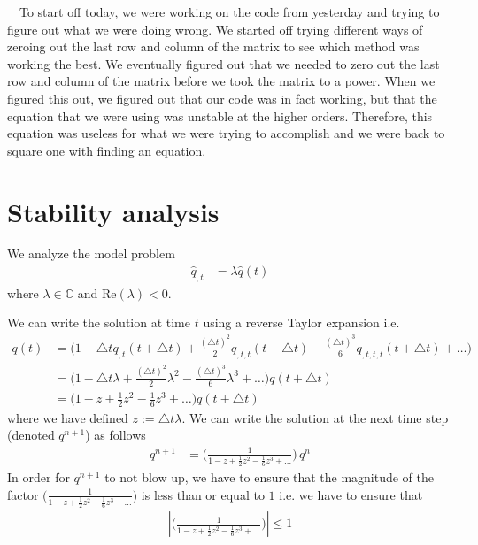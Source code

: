 \documentclass[12pt]{article}
\begin{document}
$\quad$To start off today, we were working on the code from yesterday and trying to figure out what we were doing wrong. We started off trying different ways of zeroing out the last row and column of the matrix to see which method was working the best. We eventually figured out that we needed to zero out the last row and column of the matrix before we took the matrix to a power. When we figured this out, we figured out that our code was in fact working, but that the equation that we were using was unstable at the higher orders. Therefore, this equation was useless for what we were trying to accomplish and we were back to square one with finding an equation.

\section*{Stability analysis}
We analyze the model problem
\begin{align*}
	\hat{q}_{, t} & = \lambda \hat{q}(t)
\end{align*}
where $\lambda \in \mathbb{C}$ and $\text{Re}(\lambda) < 0$.
\par
We can write the solution at time $t$ using a reverse Taylor expansion i.e.
\begin{align*}
	q(t) & = \Big( 1 - \triangle t q_{, t}(t + \triangle t) + \frac{(\triangle t)^{2}}{2} q_{, t, t}(t + \triangle t) - \frac{(\triangle t)^{3}}{6} q_{, t, t, t}(t + \triangle t) + \hdots \Big) \\
		 & = \Big( 1 - \triangle t \lambda  + \frac{(\triangle t)^{2}}{2} \lambda^{2} - \frac{(\triangle t)^{3}}{6} \lambda^{3} + \hdots \Big) q(t + \triangle t) \\
		 & = \Big( 1 - z  + \frac{1}{2} z^{2} - \frac{1}{6} z^{3} + \hdots \Big) q(t + \triangle t)
\end{align*}
where we have defined $z := \triangle t \lambda$.
We can write the solution at the next time step (denoted $q^{n+1}$) as follows
\begin{align*}
	q^{n+1} & = \Bigg( \frac{1}{1 - z  + \frac{1}{2} z^{2} - \frac{1}{6} z^{3} + \hdots} \Bigg) \, q^{n}
\end{align*}
In order for $q^{n+1}$ to not blow up, we have to ensure that the magnitude of the factor $\Bigg( \frac{1}{1 - z  + \frac{1}{2} z^{2} - \frac{1}{6} z^{3} + \hdots} \Bigg)$ is less than or equal to $1$ i.e. we have to ensure that 
\begin{align*}
	\left\lvert \Bigg( \frac{1}{1 - z  + \frac{1}{2} z^{2} - \frac{1}{6} z^{3} + \hdots} \Bigg) \right\rvert  \leq 1 
\end{align*}
\end{document}
